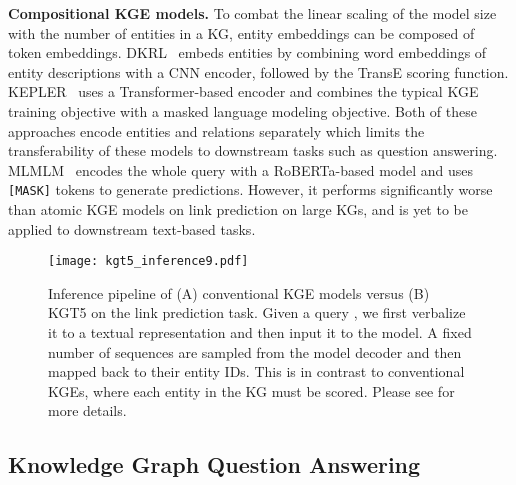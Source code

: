 \documentclass[11pt]{article}
\renewcommand\:{\colon} \newcommand{\sset}[1]{\left\{\,#1\,\right\}} \newcommand{\ssets}[1]{\left\{#1\right\}} \newcommand{\ssetn}[1]{\{\,#1\,\}}
\newcommand{\method}{\textsc{KGT5}}
\begin{document}
\noindent\textbf{Compositional KGE models.}
To combat the linear scaling of the model size with the number of entities in a KG, entity embeddings can be composed of token embeddings.
DKRL~\cite{xie2016representation} embeds entities by combining word embeddings of entity descriptions with a CNN encoder, followed by the TransE scoring function.
KEPLER~\cite{wang2021KEPLER} uses a Transformer-based encoder and combines the typical KGE training objective with a masked language modeling objective.
Both of these approaches encode entities and relations separately which limits the transferability of these models to downstream tasks such as question answering.
MLMLM~\cite{clouatre-etal-2021-mlmlm} encodes the whole query with a RoBERTa-based model and uses \texttt{[MASK]} tokens to generate predictions. However, it performs significantly worse than atomic KGE models on link prediction on large KGs, and is yet to be applied to downstream text-based tasks.



\begin{figure*}
  \centering
  \texttt{[image: kgt5\_inference9.pdf]}
  \caption{Inference pipeline of (A) conventional KGE models versus (B) \method{} on the link prediction task. Given a query , we first verbalize it to a textual representation and then input it to the model. A fixed number of sequences are sampled from the model decoder and then mapped back to their entity IDs. This is in contrast to conventional KGEs, where each entity in the KG must be scored. Please see  for more details.
} 
  \label{fig:kgt5-inference}
\end{figure*}



\subsection{Knowledge Graph Question Answering}
\label{sec:kgqa}
\end{document}
